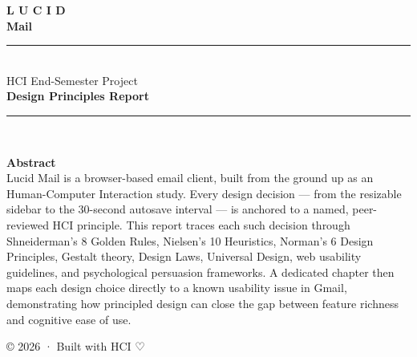 \documentclass[12pt,a4paper]{report}
\begin{document}
\onehalfspacing

\begin{titlepage}
  \pagecolor{dark}
  \color{white}
  \centering
  \vspace*{3cm}

  {\fontsize{64}{72}\selectfont\bfseries
    \textcolor[HTML]{4285F4}{L}%
    \textcolor[HTML]{EA4335}{U}%
    \textcolor[HTML]{FBBC04}{C}%
    \textcolor[HTML]{34A853}{I}%
    \textcolor[HTML]{4285F4}{D}%
  }\\[0.4cm]

  {\LARGE\bfseries\color{white!90!dark} Mail}\\[1.2cm]

  {\large\color{white!60!dark}
    \rule{0.4\textwidth}{0.4pt}\\[0.5cm]
    HCI End-Semester Project\\
    \textbf{Design Principles Report}\\
    \rule{0.4\textwidth}{0.4pt}
  }\\[2.5cm]

  \begin{tcolorbox}[
    enhanced, sharp corners,
    colback=white!5!dark, colframe=white!15!dark,
    width=0.72\textwidth,
    left=18pt, right=18pt, top=14pt, bottom=14pt,
  ]
    \centering
    \color{white!80!dark}
    {\large\bfseries Abstract}\\[8pt]
    {\small
      Lucid Mail is a browser-based email client, built from the ground up as an
      Human-Computer Interaction study. Every design decision — from the resizable
      sidebar to the 30-second autosave interval — is anchored to a named,
      peer-reviewed HCI principle. This report traces each such decision through
      Shneiderman's 8 Golden Rules, Nielsen's 10 Heuristics, Norman's 6 Design
      Principles, Gestalt theory, Design Laws, Universal Design, web usability
      guidelines, and psychological persuasion frameworks.  A dedicated chapter
      then maps each design choice directly to a known usability issue in Gmail,
      demonstrating how principled design can close the gap between feature
      richness and cognitive ease of use.
    }
  \end{tcolorbox}

  \vfill
{\footnotesize\color{white!35!dark} © 2026 · Built with HCI ♡}
\end{titlepage}
\pagecolor{white}
\color{black}

\tableofcontents
\clearpage
\end{document}
